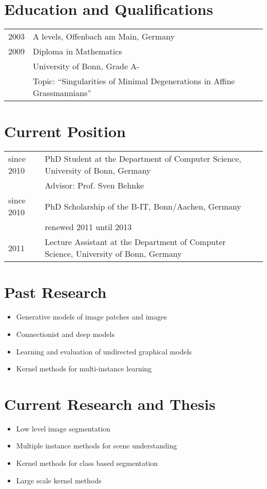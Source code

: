 \documentclass[a4paper,11pt]{article}
\begin{document}
\maketitle

\section{Education and Qualifications}
\begin{tabular}{lll}
    2003 & A levels, Offenbach am Main, Germany\\
    2009 & Diploma in Mathematics \\ & University of Bonn, Grade A-\\
         & Topic: ``Singularities of Minimal Degenerations in Affine Grassmannians''
\end{tabular}

\section{Current Position}
\begin{tabular}{lll}
    since 2010 & PhD Student at the Department of Computer Science, University of Bonn, Germany\\
               & Advisor: Prof. Sven Behnke\\
    since 2010 & PhD Scholarship of the B-IT, Bonn/Aachen, Germany\\
               & renewed 2011 until 2013\\
    2011 & Lecture Assistant at the Department of Computer Science, University of Bonn, Germany
\end{tabular}

\section{Past Research}
\begin{itemize}
    \item Generative models of image patches and images
    \item Connectionist and deep models
    \item Learning and evaluation of undirected graphical models
    \item Kernel methods for multi-instance learning
\end{itemize}

\section{Current Research and Thesis}
\begin{itemize}
    \item Low level image segmentation
    \item Multiple instance methods for scene understanding
    \item Kernel methods for class based segmentation
    \item Large scale kernel methods
\end{itemize}

\begin{publications}
\end{publications}
\end{document}
